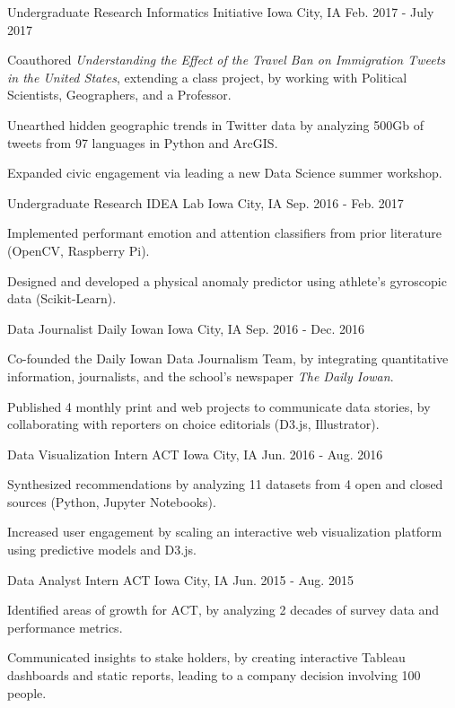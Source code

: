 \begin{cventries}
\cventry
  {Undergraduate Research}
  {Informatics Initiative}
  {Iowa City, IA}
  {Feb. 2017 - July 2017}
  {
    \begin{cvitems}
      \item {Coauthored \textit{Understanding the Effect of the Travel Ban on Immigration Tweets in the United States}, extending a class project, by working with Political Scientists, Geographers, and a Professor.}
      \item {Unearthed hidden geographic trends in Twitter data by analyzing 500Gb of tweets from 97 languages in Python and ArcGIS.}
      \item {Expanded civic engagement via leading a new Data Science summer workshop.}
    \end{cvitems}
  }
  \cventry
    {Undergraduate Research}
    {IDEA Lab}
    {Iowa City, IA}
    {Sep. 2016 - Feb. 2017}
    {
      \begin{cvitems}
        \item{Implemented performant emotion and attention classifiers from prior literature (OpenCV, Raspberry Pi).}
        \item {Designed and developed a physical anomaly predictor using athlete's gyroscopic data (Scikit-Learn). }
      \end{cvitems}
    }
  \cventry
    {Data Journalist}
    {Daily Iowan}
    {Iowa City, IA}
    {Sep. 2016 - Dec. 2016}
    {
      \begin{cvitems}
        \item {Co-founded the Daily Iowan Data Journalism Team, by integrating quantitative information, journalists, and the school's newspaper \textit{The Daily Iowan}.}
        \item {Published 4 monthly print and web projects to communicate data stories, by collaborating with reporters on choice editorials (D3.js, Illustrator).}
      \end{cvitems}
    }
  \cventry
    {Data Visualization Intern}
    {ACT}
    {Iowa City, IA}
    {Jun. 2016 - Aug. 2016}
    {
      \begin{cvitems}
        \item {Synthesized recommendations by analyzing 11 datasets from 4 open and closed sources (Python, Jupyter Notebooks). }
        \item {Increased user engagement by scaling an interactive web visualization platform using predictive models and D3.js.}
      \end{cvitems}
    }
  \cventry
    {Data Analyst Intern}
    {ACT}
    {Iowa City, IA}
    {Jun. 2015 - Aug. 2015}
    {
      \begin{cvitems}
        \item {Identified areas of growth for ACT, by analyzing 2 decades of survey data and performance metrics.}
        \item {Communicated insights to stake holders, by creating interactive Tableau dashboards and static reports, leading to a company decision involving 100 people.}
      \end{cvitems}
    }

\end{cventries}
